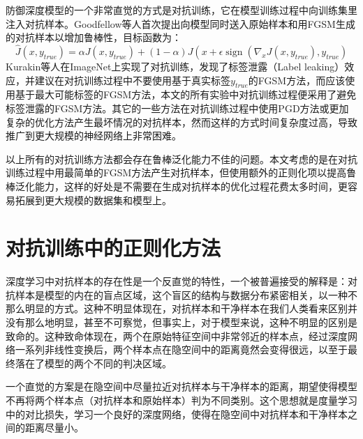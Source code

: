 防御深度模型的一个非常直觉的方式是对抗训练，它在模型训练过程中向训练集里注入对抗样本。Goodfellow等人首次提出向模型同时送入原始样本和用FGSM生成的对抗样本以增加鲁棒性\cite{goodfellow2014explaining}，目标函数为：
\begin{equation}
    \hat{J}\left(x, y_{t r u e}\right)=\alpha J\left(x, y_{t r u e}\right)+(1-\alpha) J\left(x+\epsilon \operatorname{sign}\left(\nabla_{x} J\left(x, y_{t r u e}\right), y_{t r u e}\right)\right.
\end{equation}
Kurakin等人在ImageNet上实现了对抗训练，发现了标签泄露（Label leaking）效应，并建议在对抗训练过程中不要使用基于真实标签$y_{true}$的FGSM方法，而应该使用基于最大可能标签的FGSM方法\cite{kurakin2017adversarial}，本文的所有实验中对抗训练过程便采用了避免标签泄露的FGSM方法。其它的一些方法在对抗训练过程中使用PGD方法或更加复杂的优化方法产生最坏情况的对抗样本，然而这样的方式时间复杂度过高，导致推广到更大规模的神经网络上非常困难\cite{madry2018towards, pmlr-v80-wong18a}。

以上所有的对抗训练方法都会存在鲁棒泛化能力不佳的问题。本文考虑的是在对抗训练过程中用最简单的FGSM方法产生对抗样本，但使用额外的正则化项以提高鲁棒泛化能力，这样的好处是不需要在生成对抗样本的优化过程花费太多时间，更容易拓展到更大规模的数据集和模型上。

\section{对抗训练中的正则化方法}

深度学习中对抗样本的存在性是一个反直觉的特性，一个被普遍接受的解释是：对抗样本是模型的内在的盲点区域，这个盲区的结构与数据分布紧密相关，以一种不那么明显的方式\cite{szegedy2013intriguing}。这种不明显体现在，对抗样本和干净样本在我们人类看来区别并没有那么地明显，甚至不可察觉，但事实上，对于模型来说，这种不明显的区别是致命的。这种致命体现在，两个在原始特征空间中非常邻近的样本点，经过深度网络一系列非线性变换后，两个样本点在隐空间中的距离竟然会变得很远，以至于最终落在了模型的两个不同的判决区域。

一个直觉的方案是在隐空间中尽量拉近对抗样本与干净样本的距离，期望使得模型不再将两个样本点（对抗样本和原始样本）判为不同类别。这个思想就是度量学习中的对比损失，学习一个良好的深度网络，使得在隐空间中对抗样本和干净样本之间的距离尽量小。


